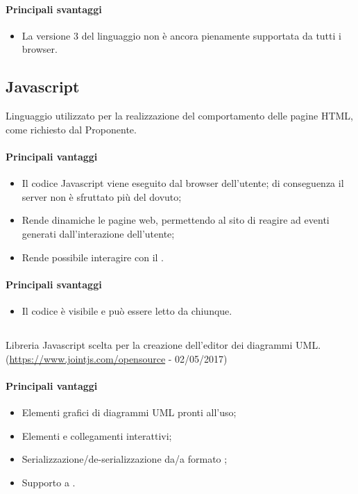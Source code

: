\documentclass[../PianoDiQualifica.tex]{subfiles}
\begin{document}
			\paragraph{Principali svantaggi}
				\begin{itemize}
					\item La versione 3 del linguaggio non è ancora pienamente supportata da tutti
					i browser. 
				\end{itemize}
		\subsection{Javascript}
			Linguaggio utilizzato per la realizzazione del comportamento delle pagine HTML, come
			richiesto dal Proponente.
			\paragraph{Principali vantaggi}
			\begin{itemize}
					\item Il codice Javascript viene eseguito dal browser dell'utente; di conseguenza
					il server non è sfruttato più del dovuto;
					\item Rende dinamiche le pagine web, permettendo al sito di reagire ad eventi
					generati dall'interazione dell'utente;
					\item Rende possibile interagire con il .
				\end{itemize}
			\paragraph{Principali svantaggi}
				\begin{itemize}
					\item Il codice è visibile e può essere letto da chiunque.
				\end{itemize}
		\subsection{}
			Libreria Javascript scelta per la creazione dell'editor dei diagrammi UML.\\
			(\url{https://www.jointjs.com/opensource} - 02/05/2017)
			\paragraph{Principali vantaggi}
			\begin{itemize}
					\item Elementi grafici di diagrammi UML pronti all'uso;
					\item Elementi e collegamenti interattivi;
					\item Serializzazione/de-serializzazione da/a formato ;
					\item Supporto a .
				\end{itemize}
\end{document}
